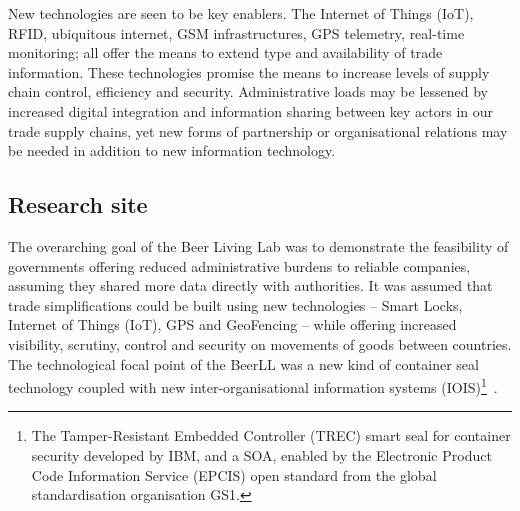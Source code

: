 \documentclass[graybox]{styles/svmult}
\begin{document}
New technologies are seen to be key enablers. The Internet of Things (IoT), RFID, ubiquitous internet, GSM infrastructures, GPS telemetry, real-time monitoring; all offer the means to extend type and availability of trade information. These technologies promise the means to increase levels of supply chain control, efficiency and security. Administrative loads may be lessened by increased digital integration and information sharing between key actors in our trade supply chains, yet new forms of partnership or organisational relations may be needed in addition to new information technology.









\subsection{Research site}
The overarching goal of the Beer Living Lab was to demonstrate the feasibility of governments offering reduced administrative burdens to reliable companies, assuming they shared more data directly with authorities. 
It was assumed that trade simplifications could be built using new technologies -- Smart Locks, Internet of Things (IoT), GPS and GeoFencing -- while offering increased visibility, scrutiny, control and security on movements of goods between countries. 
The technological focal point of the BeerLL was a new kind of container seal technology coupled with new inter-organisational information systems (IOIS)\footnote{The Tamper-Resistant Embedded Controller (TREC) smart seal for container security developed by IBM, and a SOA, enabled by the Electronic Product Code Information Service (EPCIS) open standard from the global standardisation organisation GS1.}~\citep{rukanova2011beer}.
\end{document}
